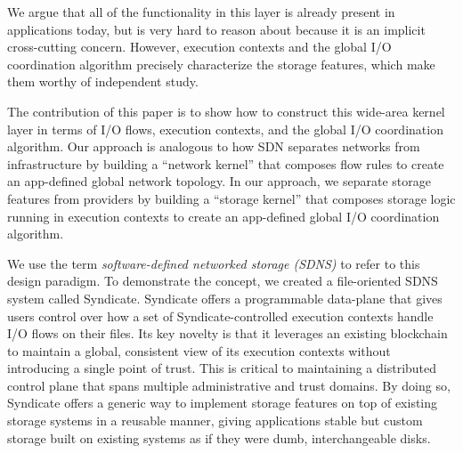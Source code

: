 We argue that all of the functionality in this layer is already present in
applications today, but is very hard to reason about because it is an implicit
cross-cutting concern. However, execution contexts and the global I/O
coordination algorithm precisely characterize the storage features, which make
them worthy of independent study.

The contribution of this paper is to show how to construct this wide-area kernel
layer in terms of I/O flows, execution contexts, and the global I/O coordination
algorithm. Our approach is analogous to how SDN separates networks from
infrastructure by building a ``network kernel'' that composes flow rules to
create an app-defined global network topology. In our approach, we separate
storage features from providers by building a ``storage kernel'' that
composes storage logic running in execution contexts to create an app-defined
global I/O coordination algorithm.

We use the term \textit{software-defined networked storage (SDNS)} to refer to this
design paradigm.  To demonstrate the concept, we created a file-oriented SDNS
system called Syndicate. Syndicate offers a programmable data-plane that gives
users control over how a set of Syndicate-controlled execution contexts handle
I/O flows on their files.  Its key novelty is that it leverages an existing
blockchain to maintain a global, consistent view of its execution contexts
without introducing a single point of trust. This is critical to maintaining a
distributed control plane that spans multiple administrative and trust domains.
By doing so, Syndicate offers a generic way to implement storage features on
top of existing storage systems in a reusable manner, giving applications stable
but custom storage built on existing systems as if they were dumb,
interchangeable disks.
